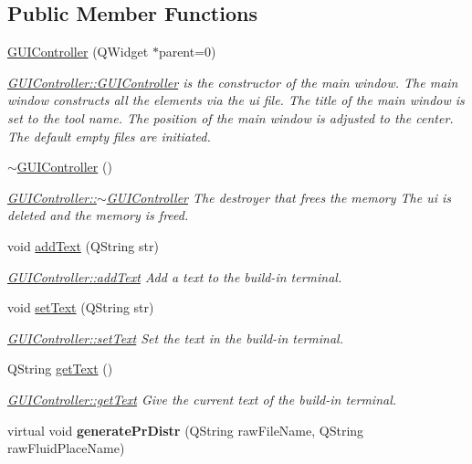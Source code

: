 \subsection*{Public Member Functions}
\begin{DoxyCompactItemize}
\item 
\hyperlink{classGUIController_a3f85fdeac642a3c52c0f0b586462eb8a}{G\-U\-I\-Controller} (Q\-Widget $\ast$parent=0)
\begin{DoxyCompactList}\small\item\em \hyperlink{classGUIController_a3f85fdeac642a3c52c0f0b586462eb8a}{G\-U\-I\-Controller\-::\-G\-U\-I\-Controller} is the constructor of the main window. The main window constructs all the elements via the ui file. The title of the main window is set to the tool name. The position of the main window is adjusted to the center. The default empty files are initiated. \end{DoxyCompactList}\item 
\hypertarget{classGUIController_acf3b4a6d7ab7be45f20ab41831644444}{\hyperlink{classGUIController_acf3b4a6d7ab7be45f20ab41831644444}{$\sim$\-G\-U\-I\-Controller} ()}\label{classGUIController_acf3b4a6d7ab7be45f20ab41831644444}

\begin{DoxyCompactList}\small\item\em \hyperlink{classGUIController_acf3b4a6d7ab7be45f20ab41831644444}{G\-U\-I\-Controller\-::$\sim$\-G\-U\-I\-Controller} The destroyer that frees the memory The ui is deleted and the memory is freed. \end{DoxyCompactList}\item 
void \hyperlink{classGUIController_a0390fd1bc1646e4a6df44e275a847ef4}{add\-Text} (Q\-String str)
\begin{DoxyCompactList}\small\item\em \hyperlink{classGUIController_a0390fd1bc1646e4a6df44e275a847ef4}{G\-U\-I\-Controller\-::add\-Text} Add a text to the build-\/in terminal. \end{DoxyCompactList}\item 
void \hyperlink{classGUIController_a82a41d70f2487920ea372ea3f24faf74}{set\-Text} (Q\-String str)
\begin{DoxyCompactList}\small\item\em \hyperlink{classGUIController_a82a41d70f2487920ea372ea3f24faf74}{G\-U\-I\-Controller\-::set\-Text} Set the text in the build-\/in terminal. \end{DoxyCompactList}\item 
Q\-String \hyperlink{classGUIController_a56423f7cdd1f3fd60d1692efd39220c4}{get\-Text} ()
\begin{DoxyCompactList}\small\item\em \hyperlink{classGUIController_a56423f7cdd1f3fd60d1692efd39220c4}{G\-U\-I\-Controller\-::get\-Text} Give the current text of the build-\/in terminal. \end{DoxyCompactList}\item 
\hypertarget{classGUIController_ad8c4880ed56e51a2dfe8c095a43ab4b2}{virtual void {\bfseries generate\-Pr\-Distr} (Q\-String raw\-File\-Name, Q\-String raw\-Fluid\-Place\-Name)}\label{classGUIController_ad8c4880ed56e51a2dfe8c095a43ab4b2}


\end{DoxyCompactItemize}
